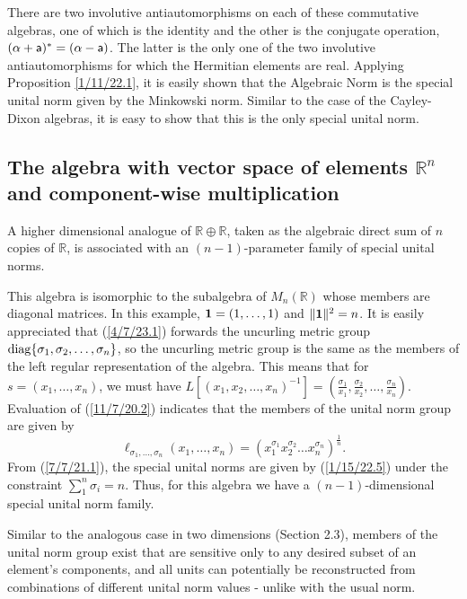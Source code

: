 \documentclass{amsart}
\numberwithin{equation}{section}
\theoremstyle{definition}
\numberwithin{theorem}{section}
\begin{document}
 There are two involutive antiautomorphisms on each of these commutative algebras, one of which is the identity and the other is the conjugate operation, $(\alpha+ {\sf a})^* = (\alpha- {\sf a})$. The latter is the only one of the two involutive antiautomorphisms  for which the Hermitian elements are real.  Applying Proposition \ref{1/11/22.1}, it is easily shown that the Algebraic Norm is the special unital norm given by the Minkowski norm.  Similar to the case of the Cayley-Dixon algebras, it is easy to show that this is the only special unital norm.

 
 \subsection{The algebra with vector space of elements $\mathbb{R}^n$ and component-wise multiplication} A higher dimensional analogue of $\mathbb{R}\oplus \mathbb{R}$, taken as the algebraic direct sum of $n$ copies of $\mathbb{R}$, is associated with an $(n-1)$-parameter family of  special unital norms.

 This algebra is isomorphic to the subalgebra of $ M_n(\mathbb{R})$  whose members are diagonal matrices. In this example, ${\bf 1} = (1,\dots,1)$ and $\|{\bf 1}\|^2 = n$.   It is easily appreciated that (\ref{4/7/23.1}) forwards the uncurling metric group ${\rm diag} \{ \sigma_1, \sigma_2,\dots,\sigma_n\}$, so the uncurling metric group is the same as the members of the left regular representation of the algebra.  This means that for $s=(x_1,\dots,x_n)$, we must have $L[(x_1,x_2,\dots,x_n)^{-1}] = (\frac{\sigma_1}{x_1}, \frac{\sigma_2}{x_2},\dots,\frac{\sigma_n}{x_n})$.     Evaluation of (\ref{11/7/20.2}) indicates that the members of the unital norm group are given by  \begin{equation}\label{1/15/22.5} \ell_{\sigma_1,\dots,\sigma_n}(x_1,\dots,x_n) = (x_1^{\sigma_1} x_2^{\sigma_2} \dots x_n^{\sigma_n})^\frac{1}{n}. \end{equation} From (\ref{7/7/21.1}), the special unital norms are given by (\ref{1/15/22.5}) under the constraint $\sum_1^n \sigma_i = n$. Thus, for this algebra we have a $(n-1)$-dimensional special unital norm family.   
 
 Similar to the analogous case in two dimensions (Section 2.3), members of the unital norm group exist that are sensitive only to any desired subset of an element's components, and all units can potentially be reconstructed from combinations of different unital norm values - unlike with the usual norm.
 
\end{document}
